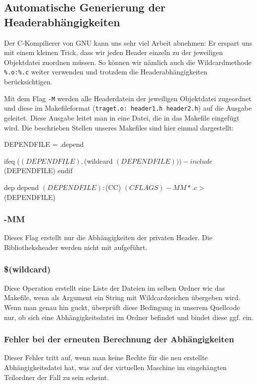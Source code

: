 \documentclass[
   draft=false
  ,paper=a4
  ,twoside=false
  ,fontsize=11pt
  ,headsepline
  ,BCOR10mm
  ,DIV11
  ,parskip=full+
]{scrartcl} %
\begin{document}
\subsection{Automatische Generierung der Headerabhängigkeiten}
Der C-Kompilierer von GNU kann uns sehr viel Arbeit abnehmen: Er erspart uns
mit einem kleinen Trick, dass wir jeden Header einzeln zu der jeweiligen
Objektdatei zuordnen müssen. So können wir nämlich auch die Wildcardmethode
\texttt{\%.o:\%.c} weiter verwenden und trotzdem die Headerabhängigkeiten
berücksichtigen.

Mit dem Flag \texttt{-M} werden alle Headerdatein der jeweiligen Objektdatei
zugeordnet und diese im Makefileformat
(\texttt{traget.o: header1.h header2.h}) auf die Ausgabe geleitet.
Diese Ausgabe leitet man in eine Datei, die in das Makefile eingefügt wird.
Die beschrieben Stellen unseres Makefiles sind hier einmal dargestellt:
\begin{makecode}
  DEPENDFILE = .depend

  ifeq ($(DEPENDFILE),$(wildcard $(DEPENDFILE)))
  -include $(DEPENDFILE)
  endif

  dep depend $(DEPENDFILE):
  	$(CC) $(CFLAGS) -MM *.c > $(DEPENDFILE)

\end{makecode}
\subsubsection*{-MM}
Dieses Flag erstellt nur die Abhängigkeiten der privaten Header. Die
Bibliotheksheader werden nicht mit aufgeführt.

\subsubsection*{\$(wildcard)}
Diese Operation erstellt eine Liste der Dateien im selben Ordner wie das
Makefile, wenn als Argument ein String mit Wildcardzeichen übergeben wird.
Wenn man genau hin guckt, überprüft diese Bedingung in unserem Quellcode nur,
ob sich eine Abhängigkeitsdatei im Ordner befindet und bindet diese ggf. ein.

\subsubsection*{Fehler bei der erneuten Berechnung der Abhängigkeiten}
Dieser Fehler tritt auf, wenn man keine Rechte für die neu erstellte
Abhängigkeitsdatei hat, was auf der virtuellen Maschine im eingehängten
Teilordner der Fall zu sein scheint.
\end{document}
